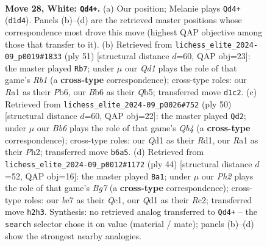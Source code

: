 \documentclass[11pt]{article}
\begin{document}
\clearpage

\begin{figure}[p]\centering
\begin{subfigure}{0.46\textwidth}\centering
\resizebox{\linewidth}{!}{%
\newchessgame
\chessboard[
  setfen={1qr5/rp2bpk1/pB2p3/8/7p/4PP2/PP4PP/R2QR1K1 w - - 0 28},
  showmover=false,
  pgfstyle=straightmove, color=movearrow, markmove={d1-d4}
]}
\caption{}
\end{subfigure}\hfill
\begin{subfigure}{0.46\textwidth}\centering
\resizebox{\linewidth}{!}{%
\newchessgame
\chessboard[
  setfen={1rr3k1/6pp/Rp2pp2/1qpp4/8/Q2PP2P/3P1PP1/R5K1 b - - 1 26},
  showmover=false,
  pgfstyle=straightmove, color=movearrow, markmove={b8-b7}
]}
\caption{}
\end{subfigure}
\\[4pt]
\begin{subfigure}{0.46\textwidth}\centering
\resizebox{\linewidth}{!}{%
\newchessgame
\chessboard[
  setfen={4r1k1/p1rb3p/1q4p1/3P1p2/1Q6/5B2/PP4PP/3R1R1K w - - 6 26},
  showmover=false,
  pgfstyle=straightmove, color=movearrow, markmove={b4-d2}
]}
\caption{}
\end{subfigure}\hfill
\begin{subfigure}{0.46\textwidth}\centering
\resizebox{\linewidth}{!}{%
\newchessgame
\chessboard[
  setfen={r2q2k1/p4pBp/1p4p1/8/8/3r1b1P/P1R2PP1/2Q2RK1 w - - 0 23},
  showmover=false,
  pgfstyle=straightmove, color=movearrow, markmove={g7-a1}
]}
\caption{}
\end{subfigure}
\caption{\textbf{Move 28, White: \texttt{Qd4+}.} (a) Our position; Melanie plays \texttt{Qd4+} (\texttt{d1d4}). Panels (b)--(d) are the retrieved master positions whose correspondence most drove this move (highest QAP objective among those that transfer to it). (b) Retrieved from \texttt{lichess\_elite\_2024-09\_p0019\#1833} (ply 51) [structural distance $d$=60, QAP obj=23]: the master played \texttt{Rb7}; under $\mu$ our \emph{Qd1} plays the role of that game's \emph{Rb1} (a \textbf{cross-type} correspondence); cross-type roles: our \emph{R}a1 as their \emph{P}b6, our \emph{B}b6 as their \emph{Q}b5; transferred move \texttt{d1c2}. (c) Retrieved from \texttt{lichess\_elite\_2024-09\_p0026\#752} (ply 50) [structural distance $d$=60, QAP obj=22]: the master played \texttt{Qd2}; under $\mu$ our \emph{Bb6} plays the role of that game's \emph{Qb4} (a \textbf{cross-type} correspondence); cross-type roles: our \emph{Q}d1 as their \emph{R}d1, our \emph{R}a1 as their \emph{P}h2; transferred move \texttt{b6a5}. (d) Retrieved from \texttt{lichess\_elite\_2024-09\_p0012\#1172} (ply 44) [structural distance $d$=52, QAP obj=16]: the master played \texttt{Ba1}; under $\mu$ our \emph{Ph2} plays the role of that game's \emph{Bg7} (a \textbf{cross-type} correspondence); cross-type roles: our \emph{b}e7 as their \emph{Q}c1, our \emph{Q}d1 as their \emph{R}c2; transferred move \texttt{h2h3}. Synthesis: no retrieved analog transferred to \texttt{Qd4+} -- the \texttt{search} selector chose it on value (material / mate); panels (b)--(d) show the strongest nearby analogies.}
\label{fig:thought-m54}
\end{figure}
\end{document}
